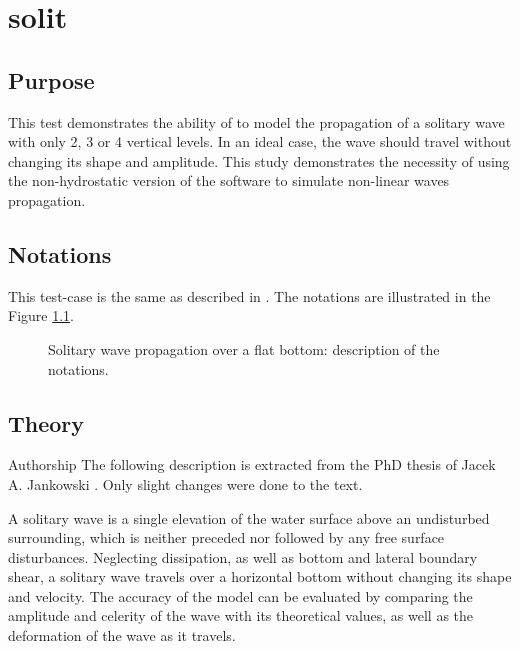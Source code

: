 \chapter{solit}
%
%

\section{Purpose}
%
This test demonstrates the ability of  to model the
propagation of a solitary wave with only 2, 3 or 4 vertical levels.
In an ideal case, the wave should travel without changing its shape and amplitude.
This study demonstrates the necessity of using the non-hydrostatic
version of the software to simulate non-linear waves propagation.
%
\section{Notations}

This test-case is the same as described in \cite{Jankowski1999}. The notations
are illustrated in the Figure \ref{fig:solit_notations}.

\begin{figure}[H]
\begin{center}
\end{center}
\caption{Solitary wave propagation over a flat bottom: description of the notations.}
\label{fig:solit_notations}
\end{figure}


\section{Theory}

\begin{WarningBlock}{Authorship}
The following description is extracted from the PhD thesis of Jacek A. Jankowski \cite{Jankowski1999}.
Only slight changes were done to the text.
\end{WarningBlock}

A solitary wave is a single elevation of the water surface above an undisturbed surrounding,
which is neither preceded nor followed by any free surface disturbances. Neglecting
dissipation, as well as bottom and lateral boundary shear, a solitary wave travels over a
horizontal bottom without changing its shape and velocity.
The accuracy of the model can be evaluated by comparing the
amplitude and celerity of the wave with its theoretical values, as well as the deformation
of the wave as it travels.\\

